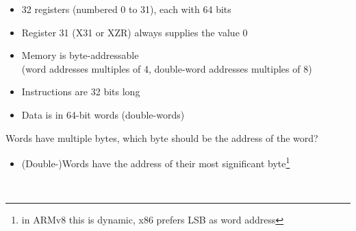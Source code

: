 \begin{frame}[fragile]
\begin{itemize}
\item 32 registers (numbered 0 to 31), each with 64 bits
\item Register 31 (X31 or XZR) always supplies the value 0
\item Memory is byte-addressable\\
  (word addresses multiples of 4, double-word addresses multiples of 8)
\item Instructions are 32 bits long
\item Data is in 64-bit words (double-words)
\end{itemize}

\begin{tcolorbox}[enhanced,attach boxed title to top center={yshift=-3mm,yshifttext=-1mm},
  colback=blue!5!white,colframe=blue!75!black,colbacktitle=blue!80!black,
  title=Think About It,fonttitle=\bfseries,
  boxed title style={size=small,colframe=red!50!black} ]
Words have multiple bytes, which byte should be the address of the word?
\begin{itemize}
    \item (Double-)Words have the address of their most significant byte\footnote{in ARMv8 this is dynamic, x86 prefers LSB as word address}
\end{itemize}

  \end{tcolorbox}

\BNotes\ifnum{}
~%
\fi\ENotes
\end{frame}

